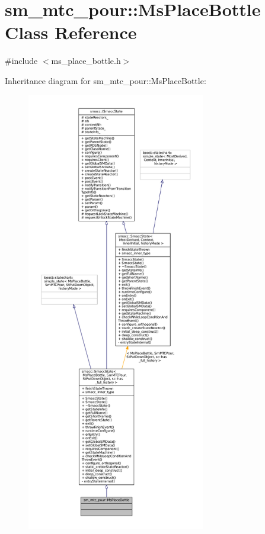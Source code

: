 \hypertarget{classsm__mtc__pour_1_1MsPlaceBottle}{}\section{sm\+\_\+mtc\+\_\+pour\+:\+:Ms\+Place\+Bottle Class Reference}
\label{classsm__mtc__pour_1_1MsPlaceBottle}


{\ttfamily \#include $<$ms\+\_\+place\+\_\+bottle.\+h$>$}



Inheritance diagram for sm\+\_\+mtc\+\_\+pour\+:\+:Ms\+Place\+Bottle\+:
\nopagebreak
\begin{figure}[H]
\begin{center}
\leavevmode
\includegraphics[height=550pt]{classsm__mtc__pour_1_1MsPlaceBottle__inherit__graph}
\end{center}
\end{figure}


